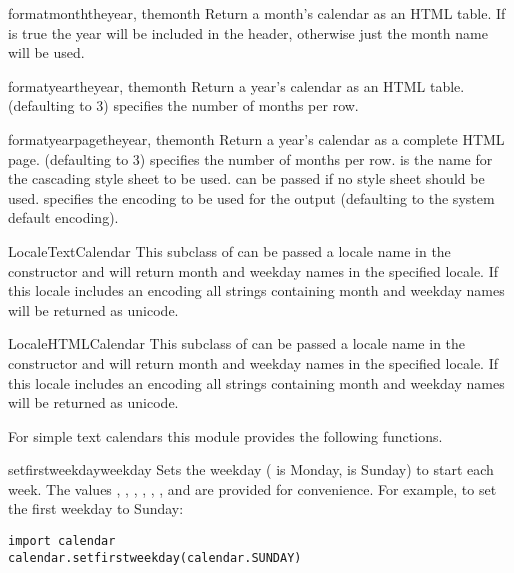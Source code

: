 \begin{methoddesc}{formatmonth}{theyear, themonth}
Return a month's calendar as an HTML table. If  is
true the year will be included in the header, otherwise just the
month name will be used.
\end{methoddesc}

\begin{methoddesc}{formatyear}{theyear, themonth}
Return a year's calendar as an HTML table.  (defaulting to 3)
specifies the number of months per row.
\end{methoddesc}

\begin{methoddesc}{formatyearpage}{theyear, themonth}
Return a year's calendar as a complete HTML page. 
(defaulting to 3) specifies the number of months per row. 
is the name for the cascading style sheet to be used. 
can be passed if no style sheet should be used. 
specifies the encoding to be used for the output (defaulting
to the system default encoding).
\end{methoddesc}


\begin{classdesc}{LocaleTextCalendar}{}
This subclass of  can be passed a locale name in the
constructor and will return month and weekday names in the specified locale.
If this locale includes an encoding all strings containing month and weekday
names will be returned as unicode.
\end{classdesc}


\begin{classdesc}{LocaleHTMLCalendar}{}
This subclass of  can be passed a locale name in the
constructor and will return month and weekday names in the specified locale.
If this locale includes an encoding all strings containing month and weekday
names will be returned as unicode.
\end{classdesc}


For simple text calendars this module provides the following functions.

\begin{funcdesc}{setfirstweekday}{weekday}
Sets the weekday ( is Monday,  is Sunday) to start
each week. The values , ,
, , ,
, and  are provided for
convenience. For example, to set the first weekday to Sunday:

\begin{verbatim}
import calendar
calendar.setfirstweekday(calendar.SUNDAY)
\end{verbatim}
\end{funcdesc}

